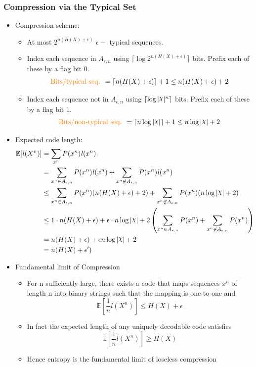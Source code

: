 \documentclass[12pt]{article}
\DeclareRobustCommand{\rchi}{{\mathpalette\irchi\relax}}
\newcommand{\irchi}[2]{\raisebox{\depth}{$#1\chi$}} %
\begin{document}
\subsubsection{Compression via the Typical Set}
\begin{itemize}
\item Compression scheme:
\begin{itemize}
\item At most $2^{n(H(X)+\epsilon)}$ $\epsilon - $ typical sequences.
\item Index each sequence in $A_{\epsilon,n}$ using $\lceil  \log 2^{n(H(X)+\epsilon)} \rceil$  bits. Prefix each of these by a flag bit 0.
$$\textrm{\textcolor{orange}{Bits/typical seq. }}=  \lceil n(H(X)+\epsilon) \rceil + 1 \le n(H(X)+\epsilon) + 2  $$
\item Index each sequence not in $A_{\epsilon,n}$ using $\lceil  \log |\rchi|^n \rceil$  bits. Prefix each of these by a flag bit 1.
$$\textrm{\textcolor{orange}{Bits/non-typical seq. }}=  \lceil n\log |\rchi| \rceil + 1 \le n\log |\rchi| + 2  $$


\end{itemize}
\item Expected code length:
\begin{align*}
\mathbb{E}[\mathit{l}(X^n)] &= \sum_{x^n}P(x^n)\mathit{l}(x^n)\\
&= \sum_{x^n \in A_{\epsilon,n}}P(x^n)\mathit{l}(x^n ) + \sum_{x^n \not \in A_{\epsilon,n}}P(x^n)\mathit{l}(x^n) \\
&\le  \sum_{x^n \in A_{\epsilon,n}}P(x^n)(n(H(X)+\epsilon) +2) + \sum_{x^n \not \in A_{\epsilon,n}}P(x^n)(n\log |\rchi| + 2)\\
&\le 1 \cdot n(H(X)+\epsilon) + \epsilon \cdot n\log |\rchi| + 2\left(\sum_{x^n \in A_{\epsilon,n}}P(x^n) +  \sum_{x^n \not \in A_{\epsilon,n}}P(x^n)  \right)\\
&= n(H(X)+\epsilon) + \epsilon  n\log |\rchi| + 2\\
&= n(H(X)+\epsilon ^\prime)
\end{align*}
\item Fundamental limit of Compression
\begin{itemize}
\item For n sufficiently large, there exists a code that maps sequences $x^n$ of length n into binary strings such that the mapping is one-to-one and 
$$\mathbb{E}[\frac{1}{n}\mathit{l}(X^n)] \le H(X) + \epsilon$$
\item In fact the expected length of any uniquely decodable code satisfies 
$$\mathbb{E}[\frac{1}{n}\mathit{l}(X^n)] \ge H(X)$$
\item Hence entropy is the fundamental limit of loseless compression
\end{itemize}


\end{itemize}
\end{document}
